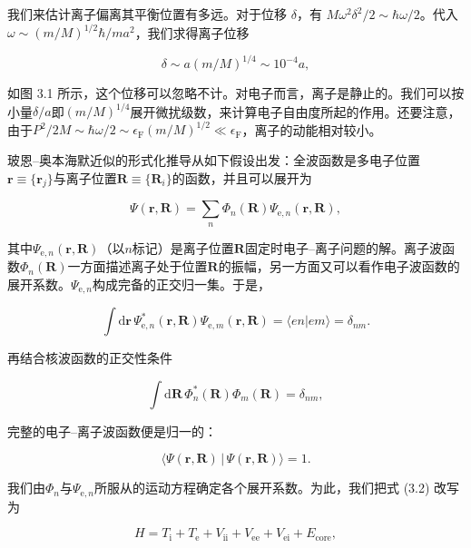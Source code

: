 我们来估计离子偏离其平衡位置有多远。对于位移 $\delta$，有 $M\omega^{2}\delta^{2}/2\sim\hbar\omega/2$。代入 $\omega\sim(m/M)^{1/2}\hbar/ma^{2}$，我们求得离子位移

\begin{equation*}
\delta \sim a(m/M)^{1/4} \sim 10^{-4}a,
\tag{3.5}
\end{equation*}

如图 3.1 所示，这个位移可以忽略不计。对电子而言，离子是静止的。我们可以按小量$\delta/a$即$(m/M)^{1/4}$展开微扰级数，来计算电子自由度所起的作用。还要注意，由于$P^2/2M\sim\hbar\omega/2\sim\epsilon_{\mathrm F}(m/M)^{1/2}\ll\epsilon_{\mathrm F}$，离子的动能相对较小。

玻恩–奥本海默近似的形式化推导从如下假设出发：全波函数是多电子位置$\mathbf r\equiv\{\mathbf r_j\}$与离子位置$\mathbf R\equiv\{\mathbf R_i\}$的函数，并且可以展开为

\begin{equation*}
\Psi(\mathbf r,\mathbf R) = \sum_n \Phi_n(\mathbf R)\Psi_{\mathrm e,n}(\mathbf r,\mathbf R),
\tag{3.6}
\end{equation*}

其中$\Psi_{\mathrm e,n}(\mathbf r,\mathbf R)$（以$n$标记）是离子位置$\mathbf R$固定时电子–离子问题的解。离子波函数$\Phi_n(\mathbf R)$一方面描述离子处于位置$\mathbf R$的振幅，另一方面又可以看作电子波函数的展开系数。$\Psi_{\mathrm e,n}$构成完备的正交归一集。于是，

\begin{equation*}
\int \mathrm d\mathbf r\, \Psi_{\mathrm e,n}^{*}(\mathbf r,\mathbf R)\Psi_{\mathrm e,m}(\mathbf r,\mathbf R) = \langle en|em\rangle = \delta_{nm}.
\tag{3.7}
\end{equation*}

再结合核波函数的正交性条件

\begin{equation*}
\int \mathrm d\mathbf R\, \Phi_n^{*}(\mathbf R)\Phi_m(\mathbf R) = \delta_{nm},
\tag{3.8}
\end{equation*}

完整的电子–离子波函数便是归一的：

\begin{equation*}
\langle \Psi(\mathbf r,\mathbf R)\,|\,\Psi(\mathbf r,\mathbf R)\rangle = 1.
\end{equation*}

我们由$\Phi_n$与$\Psi_{\mathrm e,n}$所服从的运动方程确定各个展开系数。为此，我们把式 (3.2) 改写为

\begin{equation*}
H = T_{\mathrm i} + T_{\mathrm e} + V_{\mathrm{ii}} + V_{\mathrm{ee}} + V_{\mathrm{ei}} + E_{\mathrm{core}},
\tag{3.9}
\end{equation*}


